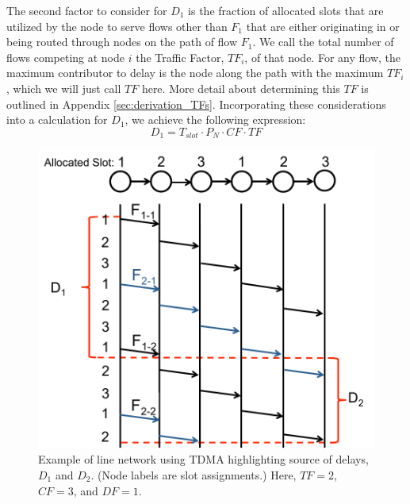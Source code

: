 The second factor to consider for $D_1$ is the fraction of allocated slots that are utilized by the node to serve flows other than $F_1$ that are either originating in or being routed through nodes on the path of flow $F_1$.  We call the total number of flows competing at node $i$ the Traffic Factor, $TF_i$, of that node.  For any flow, the maximum contributor to delay is the node along the path with the maximum $TF_i$, which we will just call $TF$ here.  More detail about determining this $TF$ is outlined in Appendix \ref{sec:derivation_TFs}.  Incorporating these considerations into a calculation for $D_1$, we achieve the following expression:  %
\begin{equation}
	D_1 = T_{slot} \cdot P_N \cdot CF \cdot TF
\end{equation}

\begin{figure}
\begin{centering}
    \includegraphics[scale=0.33]{figures/delay_limit_expl/fig_1_2.pdf}
    \caption{Example of line network using TDMA highlighting source of delays, $D_1$ and $D_2$.  (Node labels are slot assignments.)  Here, $TF = 2$, $CF = 3$, and $DF = 1$. }
    \label{fig:delay_expl_fig_3}
    \vspace{-6mm}
\end{centering}
\end{figure}

